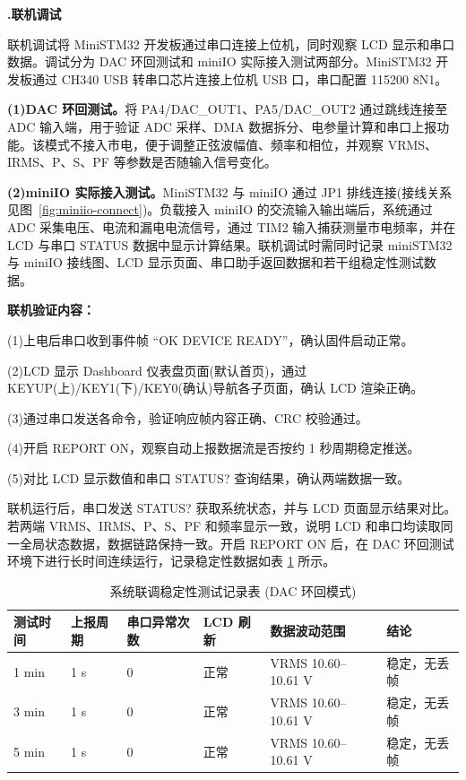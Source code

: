 \documentclass[UTF8,a4paper,zihao=-4,fontset=macnew]{ctexart}
\makeatletter
\def\@extractsubnum#1.#2\@nil{#2}
\newcommand{\subsectiontitle}[2]{%
  \setcounter{subsection}{\numexpr\@extractsubnum#1\@nil-1\relax}\refstepcounter{subsection}%
  \vspace{0.34cm}%
  {\noindent\heiti\bfseries\fontsize{16pt}{18pt}\selectfont #1.\quad #2\par}%
  \vspace{0.54cm}%
}
\makeatother
\begin{document}
\subsectiontitle{7.5}{联机调试}
\label{sec:debug-online}

联机调试将 MiniSTM32 开发板通过串口连接上位机，同时观察 LCD 显示和串口数据。调试分为 DAC 环回测试和 miniIO 实际接入测试两部分。MiniSTM32 开发板通过 CH340 USB 转串口芯片连接上位机 USB 口，串口配置 115200 8N1。

\textbf{(1)DAC 环回测试。}将 PA4/DAC\_OUT1、PA5/DAC\_OUT2 通过跳线连接至 ADC 输入端，用于验证 ADC 采样、DMA 数据拆分、电参量计算和串口上报功能。该模式不接入市电，便于调整正弦波幅值、频率和相位，并观察 VRMS、IRMS、P、S、PF 等参数是否随输入信号变化。

\textbf{(2)miniIO 实际接入测试。}MiniSTM32 与 miniIO 通过 JP1 排线连接(接线关系见图~\ref{fig:miniio-connect})。负载接入 miniIO 的交流输入输出端后，系统通过 ADC 采集电压、电流和漏电电流信号，通过 TIM2 输入捕获测量市电频率，并在 LCD 与串口 STATUS 数据中显示计算结果。联机调试时需同时记录 miniSTM32 与 miniIO 接线图、LCD 显示页面、串口助手返回数据和若干组稳定性测试数据。

\textbf{联机验证内容：}

(1)上电后串口收到事件帧 ``OK DEVICE READY''，确认固件启动正常。

(2)LCD 显示 Dashboard 仪表盘页面(默认首页)，通过 KEYUP(上)/KEY1(下)/KEY0(确认)导航各子页面，确认 LCD 渲染正确。

(3)通过串口发送各命令，验证响应帧内容正确、CRC 校验通过。

(4)开启 REPORT ON，观察自动上报数据流是否按约 1 秒周期稳定推送。

(5)对比 LCD 显示数值和串口 STATUS? 查询结果，确认两端数据一致。

联机运行后，串口发送 STATUS? 获取系统状态，并与 LCD 页面显示结果对比。若两端 VRMS、IRMS、P、S、PF 和频率显示一致，说明 LCD 和串口均读取同一全局状态数据，数据链路保持一致。开启 REPORT ON 后，在 DAC 环回测试环境下进行长时间连续运行，记录稳定性数据如表 \ref{tab:stability-test} 所示。

\begin{table}[H]
\centering
{}
\caption{系统联调稳定性测试记录表 (DAC 环回模式)}
\label{tab:stability-test}
\begin{tabular}{llllll}
\toprule
测试时间 & 上报周期 & 串口异常次数 & LCD 刷新 & 数据波动范围 & 结论 \\
\midrule
1 min & 1 s & 0 & 正常 & VRMS 10.60--10.61 V & 稳定，无丢帧 \\
3 min & 1 s & 0 & 正常 & VRMS 10.60--10.61 V & 稳定，无丢帧 \\
5 min & 1 s & 0 & 正常 & VRMS 10.60--10.61 V & 稳定，无丢帧 \\
\bottomrule
\end{tabular}
\end{table}
\end{document}
